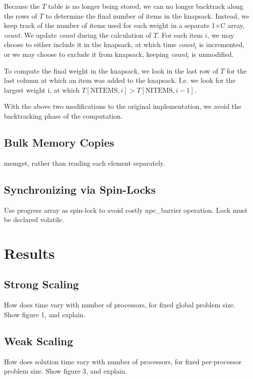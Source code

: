 \documentclass[11pt]{article} %
\begin{document}
Because the $T$ table is no longer being stored, we can no longer backtrack along the rows of $T$ to determine the final number of items in the knapsack. Instead, we keep track of the number of items used for each weight in a separate 1$\times$C array, \emph{count}. We update \emph{count} during the calculation of $T$. For each item $i$, we may choose to either include it in the knapsack, at which time \emph{count}$_i$ is incremented, or we may choose to exclude it from knapsack, keeping \emph{count}$_i$ is unmodified. 

To compute the final weight in the knapsack, we look in the last row of $T$ for the last column at which an item was added to the knapsack. I.e. we look for the largest weight i, at which $T[\text{NITEMS}, i] > T[\text{NITEMS}, i-1]$.

With the above two modifications to the original implementation, we avoid the backtracking phase of the computation.

\subsection{Bulk Memory Copies}

memget, rather than reading each element separately.

\subsection{Synchronizing via Spin-Locks}

Use progress array as spin-lock to avoid costly upc\_barrier operation. Lock must be declared volatile.

\section{Results}

\subsection{Strong Scaling}

How does time vary with number of processors, for fixed global problem size. Show figure 1, and explain.

\subsection{Weak Scaling}

How does solution time vary with number of processors, for fixed per-processor problem size. Show figure 3, and explain.
\end{document}
